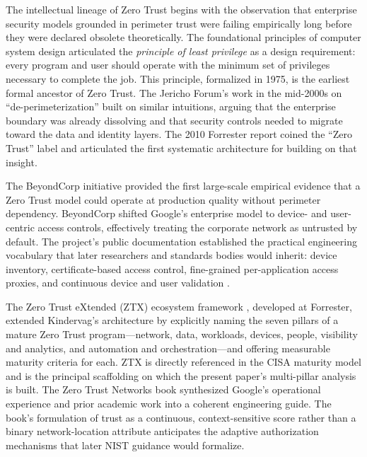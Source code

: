 \documentclass[unnumsec,webpdf,contemporary,large]{oup-authoring-template}
\theoremstyle{thmstyleone}
\theoremstyle{thmstyletwo}
\theoremstyle{thmstylethree}
\begin{document}
The intellectual lineage of Zero Trust begins with the observation that enterprise security
models grounded in perimeter trust were failing empirically long before they were declared
obsolete theoretically. The foundational principles of computer system design \cite{saltzer1975} articulated the \textit{principle of least privilege} as a design
requirement: every program and user should operate with the minimum set of privileges
necessary to complete the job. This principle, formalized in 1975, is the earliest formal
ancestor of Zero Trust. The Jericho Forum's work in the mid-2000s on ``de-perimeterization''
built on similar intuitions, arguing that the enterprise boundary was already dissolving and
that security controls needed to migrate toward the data and identity layers. The 2010 Forrester report \cite{kindervag2010} coined the ``Zero Trust'' label and articulated
the first systematic architecture for building on that insight.

The BeyondCorp initiative \cite{ward2014beyondcorp, osborn2016beyondcorp} provided the first
large-scale empirical evidence that a Zero Trust model could operate at production
quality without perimeter dependency. BeyondCorp shifted Google's enterprise model to
device- and user-centric access controls, effectively treating the corporate network as
untrusted by default. The project's public documentation established the practical
engineering vocabulary that later researchers and standards bodies would inherit: device
inventory, certificate-based access control, fine-grained per-application access proxies,
and continuous device and user validation \cite{beyer2017beyondcorp}.

The Zero Trust eXtended (ZTX) ecosystem framework \cite{cunningham2018}, developed
at Forrester, extended Kindervag's architecture by explicitly naming the seven pillars of
a mature Zero Trust program---network, data, workloads, devices, people, visibility and
analytics, and automation and orchestration---and offering measurable maturity criteria
for each. ZTX is directly referenced in the CISA maturity model \cite{cisa2023} and is
the principal scaffolding on which the present paper's multi-pillar analysis is built.
The Zero Trust Networks book \cite{gilman2017} synthesized Google's operational experience and
prior academic work into a coherent engineering guide. The book's formulation of trust
as a continuous, context-sensitive score rather than a binary network-location attribute
anticipates the adaptive authorization mechanisms that later NIST guidance would formalize.
\end{document}
